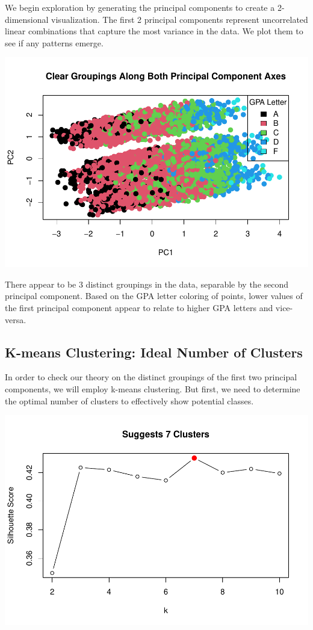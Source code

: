\documentclass[
]{article}
\begin{document}
We begin exploration by generating the principal components to create a
2-dimensional visualization. The first 2 principal components represent
uncorrelated linear combinations that capture the most variance in the
data. We plot them to see if any patterns emerge.

\includegraphics{ST494_FP_files/figure-latex/unnamed-chunk-10-1.pdf}

There appear to be 3 distinct groupings in the data, separable by the
second principal component. Based on the GPA letter coloring of points,
lower values of the first principal component appear to relate to higher
GPA letters and vice-versa.

\subsection{K-means Clustering: Ideal Number of
Clusters}\label{k-means-clustering-ideal-number-of-clusters}

In order to check our theory on the distinct groupings of the first two
principal components, we will employ k-means clustering. But first, we
need to determine the optimal number of clusters to effectively show
potential classes.

\includegraphics{ST494_FP_files/figure-latex/unnamed-chunk-11-1.pdf}
\end{document}
